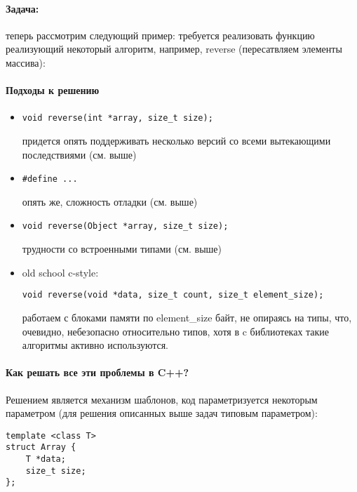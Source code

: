\paragraph{Задача:} теперь рассмотрим следующий пример: требуется реализовать функцию реализующий некоторый алгоритм, например, reverse (пересатвляем элементы массива):

\paragraph{Подходы к решению}

\begin{itemize}
\item 
\begin{lstlisting}
void reverse(int *array, size_t size);
\end{lstlisting}

придется опять поддерживать несколько версий со всеми вытекающими последствиями (см. выше)

\item
\begin{lstlisting}
#define ...
\end{lstlisting}

опять же, сложность отладки (см. выше)

\item
\begin{lstlisting}
void reverse(Object *array, size_t size);
\end{lstlisting}

трудности со встроенными типами (см. выше)

\item old school c-style:
\begin{lstlisting}
void reverse(void *data, size_t count, size_t element_size);
\end{lstlisting}

работаем с блоками памяти по element\_size байт, не опираясь на типы, что, очевидно, небезопасно
относительно типов, хотя в c библиотеках такие алгоритмы активно используются.
\end{itemize}

\paragraph{Как решать все эти проблемы в C++?} Решением является механизм шаблонов, код параметризуется некоторым параметром (для решения описанных выше задач типовым
параметром):

\begin{lstlisting}
template <class T>
struct Array {
	T *data;
	size_t size;
};
\end{lstlisting}

